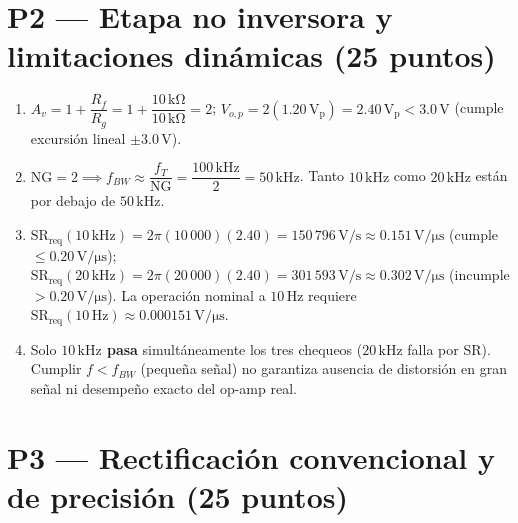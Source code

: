 \documentclass[10pt, a4paper]{article}
\begin{document}
\section*{P2 --- Etapa no inversora y limitaciones dinámicas (25 puntos)}

\begin{enumerate}
    \setlength{\itemsep}{2pt}
    \item $A_v = 1 + \dfrac{R_f}{R_g} = 1 + \dfrac{10\,\mathrm{k\Omega}}{10\,\mathrm{k\Omega}} = 2$; \quad $V_{o,p} = 2(1.20\,\mathrm{V_p}) = 2.40\,\mathrm{V_p} < 3.0\,\mathrm{V}$ (cumple excursión lineal $\pm 3.0\,\mathrm{V}$).
    \item $\mathrm{NG} = 2 \implies f_{BW} \approx \dfrac{f_T}{\mathrm{NG}} = \dfrac{100\,\mathrm{kHz}}{2} = 50\,\mathrm{kHz}$. Tanto $10\,\mathrm{kHz}$ como $20\,\mathrm{kHz}$ están por debajo de $50\,\mathrm{kHz}$.
    \item $\mathrm{SR}_{\mathrm{req}}(10\,\mathrm{kHz}) = 2\pi(10\,000)(2.40) = 150\,796\,\mathrm{V/s} \approx 0.151\,\mathrm{V/\mu s}$ (cumple $\le 0.20\,\mathrm{V/\mu s}$); \quad $\mathrm{SR}_{\mathrm{req}}(20\,\mathrm{kHz}) = 2\pi(20\,000)(2.40) = 301\,593\,\mathrm{V/s} \approx 0.302\,\mathrm{V/\mu s}$ (incumple $> 0.20\,\mathrm{V/\mu s}$). La operación nominal a $10\,\mathrm{Hz}$ requiere $\mathrm{SR}_{\mathrm{req}}(10\,\mathrm{Hz}) \approx 0.000151\,\mathrm{V/\mu s}$.
    \item Solo \textbf{$10\,\mathrm{kHz}$ pasa} simultáneamente los tres chequeos ($20\,\mathrm{kHz}$ falla por SR). Cumplir $f < f_{BW}$ (pequeña señal) no garantiza ausencia de distorsión en gran señal ni desempeño exacto del op-amp real.
\end{enumerate}

\section*{P3 --- Rectificación convencional y de precisión (25 puntos)}
\end{document}
